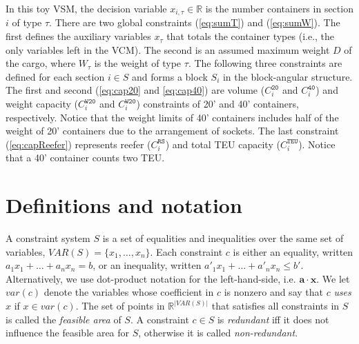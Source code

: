 \documentclass{llncs}
\newcommand{\var}{\mathit{var}}
\newcommand{\VAR}{\mathit{VAR}}
\newcommand{\trt}[1]{\texttt{#1}}
\newcommand{\ve}{\mathbf}
\begin{document}
In this toy VSM, the decision variable $x_{i,\tau} \in \mathbb{R}$ is the number containers in section $i$ of type $\tau$. There are two global constraints (\ref{eq:sumT}) and (\ref{eq:sumW}). The first defines the auxiliary variables $x_\tau$ that totals the container types (i.e., the only variables left in the VCM). The second is an assumed maximum weight $D$ of the cargo, where $W_\tau$ is the weight of type $\tau$. The following three constraints are defined for each section $i \in S$ and forms a block $S_i$ in the block-angular structure. The first and second (\ref{eq:cap20} and \ref{eq:cap40}) are volume ($C_i^\trt{20}$ and $C_i^\trt{40}$) and weight capacity ($C_i^\trt{W20}$ and $C_i^\trt{W20}$) constraints of 20' and 40' containers, respectively. Notice that the weight limits of 40' containers includes half of the weight of 20' containers due to the arrangement of sockets. The last constraint (\ref{eq:capReefer})  represents reefer ($C_i^\trt{RS}$) and total TEU capacity ($C_i^\trt{TEU}$). Notice that a 40' container counts two TEU.    

\section{Definitions and notation} \label{sec:notation}
A constraint system $S$ is a set of equalities and inequalities over the same set of variables, $\VAR(S)=\{x_1,\ldots, x_n\}$. Each constraint $c$ is either an equality, written $a_1x_1 + \ldots +a_nx_n = b$, or an inequality, written $a'_1x_1 + \ldots +a'_nx_n\leq b'$. Alternatively, we use dot-product notation for the left-hand-side, i.e. $\ve{a}\cdot \ve{x}$. 
We let $\var(c)$ denote the variables whose coefficient in $c$ is nonzero and say that $c$ \emph{uses} $x$ if $x\in \var(c)$. 
The set of points in $\mathbb{R}^{|\VAR(S)|}$ that satisfies all constraints in $S$ is called the \emph{feasible area} of $S$. A constraint $c\in S$ is \emph{redundant} iff it does not influence the feasible area for $S$, otherwise it is called \emph{non-redundant}.  
\end{document}
